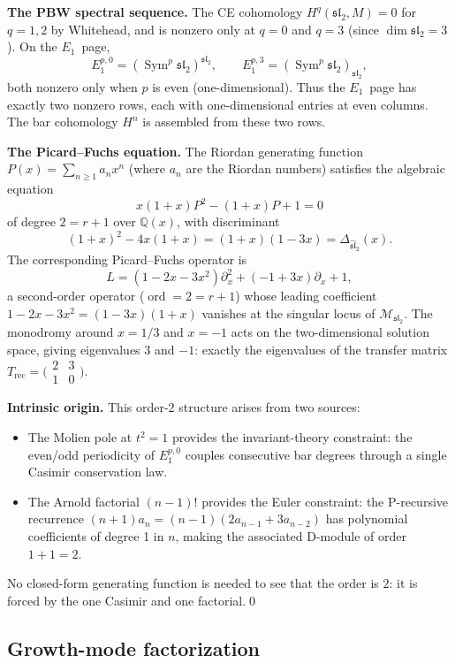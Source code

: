 \medskip\noindent
\textbf{The PBW spectral sequence.}
The CE cohomology \(H^q(\mathfrak{sl}_2,M)=0\) for
\(q=1,2\) by Whitehead, and is nonzero only at \(q=0\) and
\(q=3\) (since \(\dim\mathfrak{sl}_2=3\)).
On the \(E_1\)~page,
\[
E_1^{p,0}=(\operatorname{Sym}^p\mathfrak{sl}_2)^{\mathfrak{sl}_2},
\qquad
E_1^{p,3}=(\operatorname{Sym}^p\mathfrak{sl}_2)_{\mathfrak{sl}_2},
\]
both nonzero only when \(p\) is even (one-dimensional).
Thus the \(E_1\)~page has exactly two nonzero rows,
each with one-dimensional entries at even columns.
The bar cohomology \(H^n\) is assembled from these two rows.

\medskip\noindent
\textbf{The Picard--Fuchs equation.}
The Riordan generating function
\(P(x)=\sum_{n\ge 1}a_n x^n\) (where \(a_n\) are the Riordan
numbers) satisfies the algebraic equation
\[
x(1{+}x)P^2-(1{+}x)P+1=0
\]
of degree \(2=r+1\) over \(\mathbb Q(x)\),
with discriminant
\[
(1{+}x)^2-4x(1{+}x)=(1{+}x)(1{-}3x)
=\Delta_{\widehat{\mathfrak{sl}}_2}(x).
\]
The corresponding Picard--Fuchs operator is
\[
L=(1{-}2x{-}3x^2)\partial_x^2+(-1{+}3x)\partial_x+1,
\]
a second-order operator (\(\operatorname{ord}=2=r+1\))
whose leading coefficient
\(1{-}2x{-}3x^2=(1{-}3x)(1{+}x)\)
vanishes at the singular locus of \(\mathcal M_{\mathfrak{sl}_2}\).
The monodromy around \(x=1/3\) and \(x=-1\) acts on the
two-dimensional solution space, giving eigenvalues \(3\)
and \(-1\): exactly the eigenvalues of the transfer matrix
\(T_{\mathrm{rec}}=\bigl(\begin{smallmatrix}2&3\\1&0
\end{smallmatrix}\bigr)\).

\medskip\noindent
\textbf{Intrinsic origin.}
This order-2 structure arises from two sources:
\begin{itemize}
\item
The Molien pole at \(t^2=1\) provides the invariant-theory
constraint: the even/odd periodicity of
\(E_1^{p,0}\) couples consecutive bar degrees through a
single Casimir conservation law.
\item
The Arnold factorial \((n{-}1)!\) provides the Euler constraint:
the P-recursive recurrence
\((n{+}1)a_n=(n{-}1)(2a_{n{-}1}+3a_{n{-}2})\)
has polynomial coefficients of degree 1 in \(n\),
making the associated D-module of order \(1+1=2\).
\end{itemize}
No closed-form generating function is needed to see that the
order is \(2\): it is forced by the one Casimir and one
factorial.\qed

\subsection{Growth-mode factorization}

